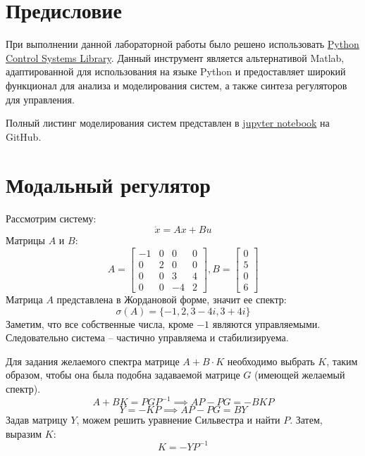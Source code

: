 \tableofcontents
\section*{Предисловие}
При выполнении данной лабораторной работы было решено использовать 
\href{https://python-control.readthedocs.io/en/0.9.4/}{Python Control Systems Library}.
Данный инструмент является альтернативой Matlab, адаптированной для использования на 
языке Python и предоставляет широкий функционал для анализа и моделирования систем,
а также синтеза регуляторов для управления.

Полный листинг моделирования систем представлен в \href{https://github.com/diuzhevVlad/control-theory-itmo-fall-2023/blob/main/Lab7/Lab7.ipynb}{jupyter notebook} на GitHub.

\pagebreak

\section{Модальный регулятор}
Рассмотрим систему:
\begin{equation}
    \dot{x} = Ax + Bu
\end{equation}
Матрицы $A$ и $B$:
\begin{equation*}
    A = \begin{bmatrix}
        -1 & 0 & 0 & 0 \\
        0 & 2 & 0 & 0 \\
        0 & 0 & 3 & 4 \\
        0 & 0 & -4 & 2
    \end{bmatrix},
    B = \begin{bmatrix}
        0 \\ 5 \\ 0 \\ 6
    \end{bmatrix}
\end{equation*}
Матрица $A$ представлена в Жордановой форме, значит ее спектр:
\begin{equation*}
    \sigma (A) = \{-1,2,3-4i, 3+4i\}
\end{equation*}
Заметим, что все собственные числа, кроме $-1$ являются управляемыми. Следовательно система -- частично управляема и стабилизируема.

Для задания желаемого спектра матрице $A + B \cdot K$ необходимо выбрать $K$, таким образом, чтобы
она была подобна задаваемой матрице $G$ (имеющей желаемый спектр).
\begin{equation}
    A + BK = PGP^{-1} \implies AP - PG = -BKP
\end{equation}
\begin{equation*}
    Y = -KP \implies AP - PG = BY 
\end{equation*}
Задав матрицу $Y$, можем решить уравнение Сильвестра и найти $P$. Затем, выразим $K$:
\begin{equation}
    K = -YP^{-1}
\end{equation}

